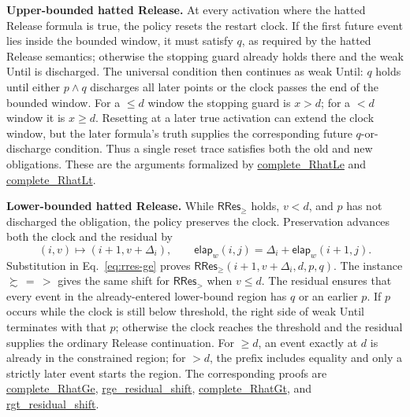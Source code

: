 \documentclass[manuscript]{acmart}
\newcommand{\elapsed}{\mathsf{elap}}
\newcommand{\runinhead}[1]{\par\noindent\textbf{#1}\enspace}
\newcommand{\Rocqid}[1]{\url{#1}}
\begin{document}
\runinhead{Upper-bounded hatted Release.}
At every activation where the hatted Release formula is true, the policy
resets the restart clock. If the first future event lies inside the bounded window, it must satisfy $q$,
as required by the hatted Release semantics; otherwise the stopping guard
already holds there and the weak Until is discharged. The universal condition then
continues as weak Until: $q$ holds until either $p\land q$ discharges all
later points or the clock passes the end of the bounded window. For a
$\le d$ window the stopping guard is $x>d$; for a $<d$ window it is
$x\ge d$. Resetting at a later true activation can extend the clock window,
but the later formula's truth supplies the corresponding future
$q$-or-discharge condition. Thus a single reset trace satisfies both the old
and new obligations. These are the arguments formalized by
\Rocqid{complete_RhatLe} and \Rocqid{complete_RhatLt}.

\runinhead{Lower-bounded hatted Release.}
While $\mathsf{RRes}_{\ge}$ holds, $v<d$, and $p$ has not discharged the
obligation, the policy preserves the clock. Preservation advances both the
clock and the residual by
\[
(i,v)\longmapsto(i+1,v+\Delta_i),
\qquad
\elapsed_w(i,j)=\Delta_i+\elapsed_w(i+1,j).
\]
Substitution in Eq.~\eqref{eq:rres-ge} proves
$\mathsf{RRes}_{\ge}(i+1,v+\Delta_i,d,p,q)$. The instance $\succsim\,=\,>$
gives the same shift for $\mathsf{RRes}_{>}$ when $v\le d$. The residual ensures that
every event in the already-entered lower-bound region has $q$ or an earlier
$p$. If $p$ occurs while the clock is still below threshold, the right side
of weak Until terminates with that $p$; otherwise the clock reaches the
threshold and the residual supplies the ordinary Release continuation.
For $\ge d$, an event exactly at $d$ is already in the constrained region;
for $>d$, the prefix includes equality and only a strictly later event
starts the region. The corresponding proofs are
\Rocqid{complete_RhatGe}, \Rocqid{rge_residual_shift},
\Rocqid{complete_RhatGt}, and \Rocqid{rgt_residual_shift}.
\end{document}
